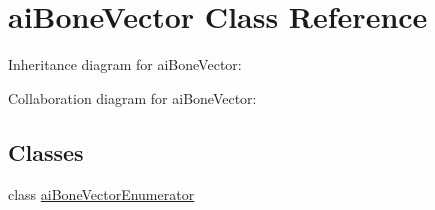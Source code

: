 \hypertarget{classai_bone_vector}{\section{ai\+Bone\+Vector Class Reference}
\label{classai_bone_vector}
}


Inheritance diagram for ai\+Bone\+Vector\+:


Collaboration diagram for ai\+Bone\+Vector\+:
\subsection*{Classes}
\begin{DoxyCompactItemize}
\item 
class \hyperlink{classai_bone_vector_1_1ai_bone_vector_enumerator}{ai\+Bone\+Vector\+Enumerator}
\end{DoxyCompactItemize}
